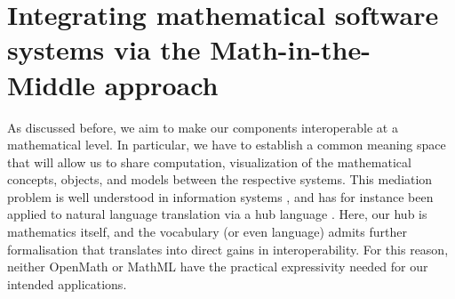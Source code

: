 \section{Integrating mathematical software systems via the Math-in-the-Middle approach}\label{sec:mitm}


As discussed before, we aim to make our components interoperable at a mathematical level. In particular, we have to establish a common meaning space that will 
allow us to share computation, visualization of the mathematical concepts, objects, and models between the respective systems. This mediation problem is well understood in information systems \cite{mediator}, and has for instance been applied to natural language translation via a hub language \cite{kanayama}. Here, our hub is mathematics itself, and the vocabulary (or even language) admits further formalisation that translates into direct gains in interoperability. For this reason, neither OpenMath \cite{openmath} or MathML \cite{mathml} have the practical expressivity needed for our intended applications. 




